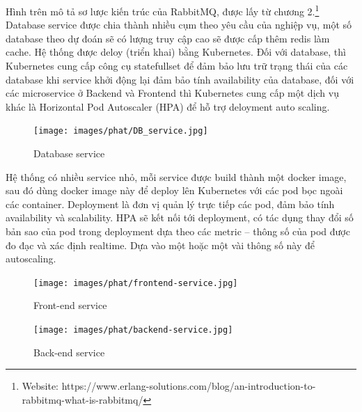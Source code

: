 \noindent Hình trên mô tả sơ lược kiến trúc của RabbitMQ, được lấy từ chương 2.\footnote{Website: https://www.erlang-solutions.com/blog/an-introduction-to-rabbitmq-what-is-rabbitmq/}\\[0.5cm]
\noindent Database service được chia thành nhiều cụm theo yêu cầu của nghiệp vụ, một số database theo dự đoán sẽ có lượng truy cập cao sẽ được cấp thêm redis làm cache. Hệ thống được deloy (triển khai) bằng Kubernetes. Đối với database, thì Kubernetes cung cấp công cụ statefullset để đảm bảo lưu trữ trạng thái của các database khi service khởi động lại đảm bảo tính availability của database, đối với các microservice ở Backend và Frontend thì Kubernetes cung cấp một dịch vụ khác là Horizontal Pod Autoscaler (HPA) để hỗ trợ deloyment auto scaling.
 \begin{figure}[H]
    \begin{center}
    \texttt{[image: images/phat/DB\_service.jpg]}
    \vspace*{7mm}
    \caption{Database service}
    \end{center}
    \label{}
\end{figure}
\noindent Hệ thống có nhiều service nhỏ, mỗi service được build thành một docker image, sau đó dùng docker image này để deploy lên Kubernetes với các pod bọc ngoài các container. Deployment là đơn vị quản lý trực tiếp các pod, đảm bảo tính availability và scalability. HPA sẽ kết nối tới deployment, có tác dụng thay đổi số bản sao của pod trong deployment dựa theo các metric – thông số của pod được đo đạc và xác định realtime. Dựa vào một hoặc một vài thông số này để autoscaling.
 \begin{figure}[H]
    \begin{center}
    \texttt{[image: images/phat/frontend-service.jpg]}
    \vspace*{7mm}
    \caption{Front-end service}
    \end{center}
    \label{}
\end{figure}
 \begin{figure}[H]
    \begin{center}
    \texttt{[image: images/phat/backend-service.jpg]}
    \vspace*{7mm}
    \caption{Back-end service}
    \end{center}
    \label{}
\end{figure}

